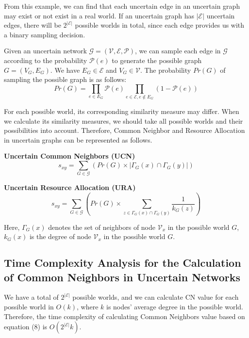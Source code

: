 \documentclass[\main/thesis.tex]{subfiles}
\begin{document}
From this example, we can find that each uncertain edge in an uncertain graph may exist or not exist in a real world. If an uncertain graph has $|\mathcal{E}|$ uncertain edges, there will be $2^{|\mathcal{E}|}$ possible worlds in total, since each edge provides us with a binary sampling decision.

Given an uncertain network $\mathcal{G = (V,E,P)}$, we can sample each edge in $\mathcal{G}$ according to the probability $\mathcal{P}(e)$ to generate the possible graph $G = (V_G,E_G)$. We have $E_G \in \mathcal{E}$ and $V_G \in \mathcal{V}$. The probability $Pr(G)$ of sampling the possible graph is as follows:
\begin{equation}
Pr(G) = \prod_{e\in E_G}\mathcal{P}(e)\prod_{e\in \mathcal{E}, e\notin E_G}(1-\mathcal{P}(e))
\end{equation}

For each possible world, its corresponding similarity measure may differ. When we calculate its similarity measures, we should take all possible worlds and their possibilities into account. Therefore, Common Neighbor and Resource Allocation in uncertain graphs can be represented as follows.

\textbf{Uncertain Common Neighbors (UCN)}
\begin{equation}
s_{xy}=\sum_{G\in \mathcal{G}}( Pr(G)\times|\Gamma_G(x)\cap\Gamma_G(y)|)
\end{equation}

\textbf{Uncertain Resource Allocation (URA)}
\begin{equation}
s_{xy}=\sum_{G\in \mathcal{G}}( Pr(G)\times\sum_{z\in \Gamma_G(x)\cap\Gamma_G(y)}\frac{1}{k_G(z)})
\end{equation}

Here, $\Gamma_G(x)$ denotes the set of neighbors of node $\mathcal{V}_x$ in the possible world $G$, $k_G(x)$ is the degree of node $\mathcal{V}_x$ in the possible world $G$.

\subsection{Time Complexity Analysis for the Calculation of Common Neighbors in Uncertain Networks}
We have a total of $2^{|\mathcal{E}|}$ possible worlds, and we can calculate CN value for each possible world in $O(k)$, where $k$ is nodes' average degree in the possible world. Therefore, the time complexity of calculating Common Neighbors value based on equation (8) is $O(2^{|\mathcal{E}|}k)$.
\end{document}
